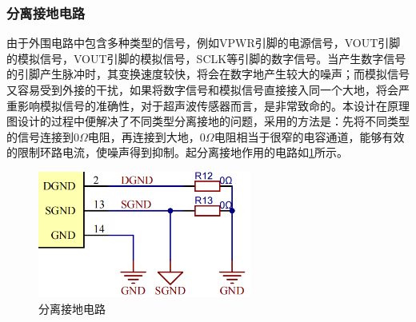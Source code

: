\subsubsection{分离接地电路}
由于外围电路中包含多种类型的信号，例如VPWR引脚的电源信号，VOUT引脚的模拟信号，VOUT引脚的模拟信号，SCLK等引脚的数字信号。当产生数字信号的引脚产生脉冲时，其变换速度较快，将会在数字地产生较大的噪声；而模拟信号又容易受到外接的干扰，如果将数字信号和模拟信号直接接入同一个大地，将会严重影响模拟信号的准确性，对于超声波传感器而言，是非常致命的。本设计在原理图设计的过程中便解决了不同类型分离接地的问题，采用的方法是：先将不同类型的信号连接到0$\Omega$电阻，再连接到大地，0$\Omega$电阻相当于很窄的电容通道，能够有效的限制环路电流，使噪声得到抑制。起分离接地作用的电路如\ref{分离接地电路}所示。
\begin{figure}[!h]
	\centering
	\includegraphics[width=7cm]{figure/seperate ground.png}
	\caption{分离接地电路}
	\label{分离接地电路}
\end{figure}
